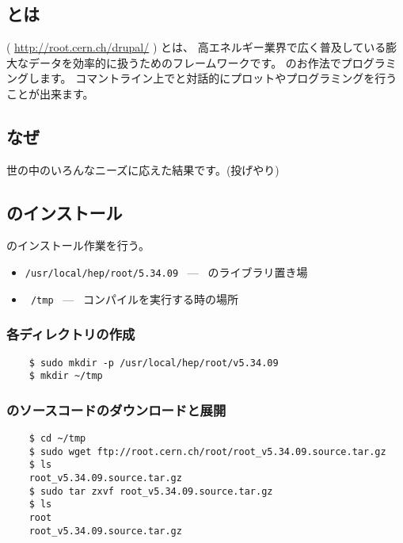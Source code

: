 \clearpage
 \section{\ROOT}


  \subsection{\ROOT とは}
  \ROOT ( \url{http://root.cern.ch/drupal/} ) とは、
  高エネルギー業界で広く普及している膨大なデータを効率的に扱うためのフレームワークです。
  \Cpp のお作法でプログラミングします。
  コマントライン上で\ROOT と対話的にプロットやプログラミングを行うことが出来ます。


  \subsection{なぜ\ROOT }
  世の中のいろんなニーズに応えた結果です。(投げやり)


  \subsection{\ROOT のインストール}
  \ROOT のインストール作業を行う。
  \begin{itemize}
   \item \texttt{/usr/local/hep/root/5.34.09} \ --- \ \ROOT のライブラリ置き場
   \item \texttt{~/tmp} \ --- \ コンパイルを実行する時の場所
  \end{itemize}


   \subsubsection*{各ディレクトリの作成}
\begin{verbatim}
	$ sudo mkdir -p /usr/local/hep/root/v5.34.09
	$ mkdir ~/tmp
\end{verbatim}


   \subsubsection*{\ROOT のソースコードのダウンロードと展開}
\begin{verbatim}
	$ cd ~/tmp
	$ sudo wget ftp://root.cern.ch/root/root_v5.34.09.source.tar.gz
	$ ls
	root_v5.34.09.source.tar.gz
	$ sudo tar zxvf root_v5.34.09.source.tar.gz
	$ ls
	root
	root_v5.34.09.source.tar.gz
\end{verbatim}


